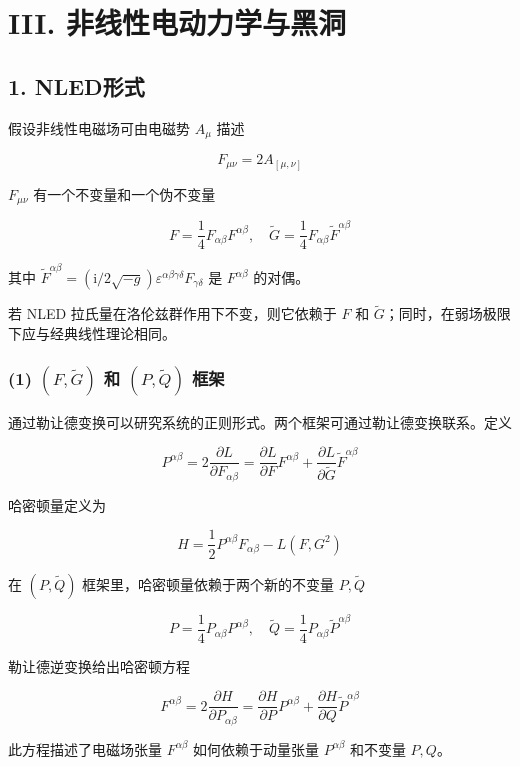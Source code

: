 \documentclass[aps,prl,preprint,groupedaddress,showkeys]{revtex4-2}
\begin{document}
\section{III. 非线性电动力学与黑洞}

\subsection{1. NLED形式}

假设非线性电磁场可由电磁势 $A_\mu$ 描述

$$
F_{\mu\nu}
=2A_{[\mu,\nu]}
$$

$F_{\mu\nu}$ 有一个不变量和一个伪不变量

$$
F = \frac{1 }{4 } F_{\alpha\beta}F^{\alpha\beta},\quad
\tilde{G} = \frac{1 }{4 } F_{\alpha\beta} \tilde{F}^{\alpha\beta} 
$$

其中 $\tilde{F}^{\alpha\beta}=\left(\mathrm{i}/2\sqrt{-g} \right)\varepsilon^{\alpha\beta\gamma\delta}F_{\gamma\delta}$ 是 $F^{\alpha\beta}$ 的对偶。

若 NLED 拉氏量在洛伦兹群作用下不变，则它依赖于 $F$ 和 $\tilde{G}$；同时，在弱场极限下应与经典线性理论相同。

\subsubsection{(1) $(F,\tilde{G})$ 和 $(P,\tilde{Q})$ 框架}

通过勒让德变换可以研究系统的正则形式。两个框架可通过勒让德变换联系。定义

$$
P^{\alpha\beta}
=2\frac{\partial L }{\partial F_{\alpha\beta} } 
=\frac{\partial L }{\partial F } F^{\alpha\beta} + \frac{\partial L }{\partial \tilde{G} } \tilde{F}^{\alpha\beta}
$$

哈密顿量定义为

$$
H
=\frac{1 }{2 } P^{\alpha\beta} F_{\alpha\beta} - L\left(F,G^2 \right)
$$

在 $(P,\tilde{Q})$ 框架里，哈密顿量依赖于两个新的不变量 $P,\tilde{Q}$

$$
P = \frac{1 }{4 } P_{\alpha\beta} P^{\alpha\beta},\quad
\tilde{Q} = \frac{1 }{4 } P_{\alpha\beta}\tilde{P}^{\alpha\beta}
$$

勒让德逆变换给出哈密顿方程

$$
F^{\alpha\beta}
=2\frac{\partial H }{\partial P_{\alpha\beta} } 
=\frac{\partial H }{\partial P } P^{\alpha\beta} + \frac{\partial H }{\partial Q } \tilde{P}^{\alpha\beta}
$$

此方程描述了电磁场张量 $F^{\alpha\beta}$ 如何依赖于动量张量 $P^{\alpha\beta}$ 和不变量 $P,Q$。
\end{document}
